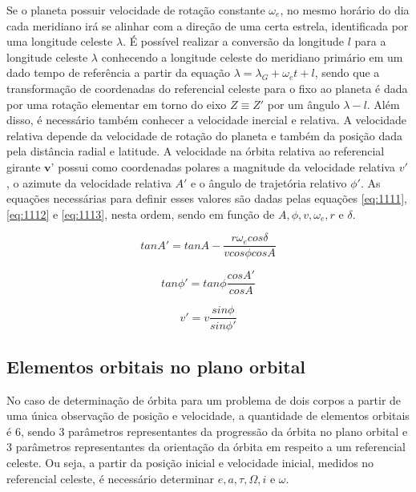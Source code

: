 Se o planeta possuir velocidade de rotação constante $\omega_{e}$, no mesmo horário do dia cada meridiano irá se alinhar com a direção de uma certa estrela, identificada por uma longitude celeste $\lambda$. É possível realizar a conversão da longitude $l$ para a longitude celeste $\lambda$ conhecendo a longitude celeste do meridiano primário em um dado tempo de referência a partir da equação $\lambda = \lambda_{G} + \omega_{e}t+l$, sendo que a transformação de coordenadas do referencial celeste para o fixo ao planeta é dada por uma rotação elementar em torno do eixo $Z \equiv Z'$ por um ângulo $\lambda-l$. Além disso, é necessário também conhecer a velocidade inercial e relativa. A velocidade relativa depende da velocidade de rotação do planeta e também da posição dada pela distância radial e latitude. A velocidade na órbita relativa ao referencial girante $\textbf{v'}$ possui como coordenadas polares a magnitude da velocidade relativa $v'$, o azimute da velocidade relativa $A'$ e o ângulo de trajetória relativo $\phi '$. As equações necessárias para definir esses valores são dadas pelas equações \ref{eq:1111}, \ref{eq:1112} e \ref{eq:1113}, nesta ordem, sendo em função de $A, \phi, v, \omega_{e}, r$ e $\delta$.

\begin{equation}
    tanA' = tanA-\frac{r\omega_{e} cos\delta}{vcos\phi cosA}
    \label{eq:1111}
\end{equation}

\begin{equation}
    tan\phi '= tan\phi \frac{cosA'}{cosA}
    \label{eq:1112}
\end{equation}

\begin{equation}
    v' = v\frac{sin\phi}{sin\phi '}
    \label{eq:1113}
\end{equation}

\subsection{Elementos orbitais no plano orbital}

No caso de determinação de órbita para um problema de dois corpos a partir de uma única observação de posição e velocidade, a quantidade de elementos orbitais é 6, sendo 3 parâmetros representantes da progressão da órbita no plano orbital e 3 parâmetros representantes da orientação da órbita em respeito a um referencial celeste. Ou seja, a partir da posição inicial e velocidade inicial, medidos no referencial celeste, é necessário determinar $e, a, \tau,\Omega, i$ e $\omega$.

